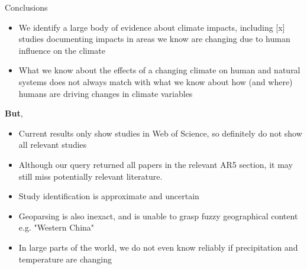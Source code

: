 \documentclass[9pt]{beamer}
\begin{document}
%
%			
%		
%

\begin{frame}{Conclusions}

\begin{itemize}
	\item We identify a large body of evidence about climate impacts, including [x] studies documenting impacts in areas we know are changing due to human influence on the climate
	\item What we know about the effects of a changing climate on human and natural systems does not always match with what we know about how (and where) humans are driving changes in climate variables 
\end{itemize}

\textbf{But}, 

\begin{itemize}
	\item Current results only show studies in Web of Science, so definitely do not show all relevant studies
	\item Although our query returned all papers in the relevant AR5 section, it may still miss potentially relevant literature.
	\item Study identification is approximate and uncertain
	\item Geoparsing is also inexact, and is unable to grasp fuzzy geographical content e.g. "Western China"
	\item In large parts of the world, we do not even know reliably if precipitation and temperature are changing
\end{itemize}

\end{frame}
\end{document}

